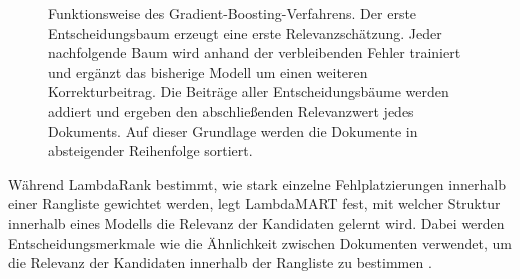 \begin{figure}[H]
  \caption{ Funktionsweise des Gradient-Boosting-Verfahrens. Der erste Entscheidungsbaum erzeugt eine erste Relevanzschätzung. 
  Jeder nachfolgende Baum wird anhand der verbleibenden Fehler trainiert und ergänzt das bisherige Modell um einen weiteren Korrekturbeitrag. 
  Die Beiträge aller Entscheidungsbäume werden addiert und ergeben den abschließenden Relevanzwert jedes Dokuments. 
  Auf dieser Grundlage werden die Dokumente in absteigender Reihenfolge sortiert. } 
  \label{fig:gradient_boosting} 
\end{figure}


Während LambdaRank bestimmt, wie stark einzelne Fehlplatzierungen innerhalb einer Rangliste gewichtet werden, legt LambdaMART fest, mit welcher Struktur innerhalb eines Modells die Relevanz der Kandidaten gelernt wird.
Dabei werden Entscheidungsmerkmale wie die Ähnlichkeit zwischen Dokumenten verwendet, um die Relevanz der Kandidaten innerhalb der Rangliste zu bestimmen \parencite{burges2010lambdamart}.

